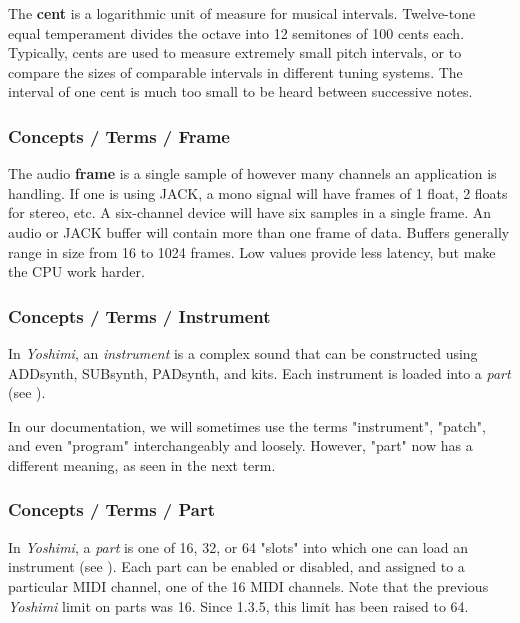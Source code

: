   The \textbf{cent}
   is a logarithmic unit of measure for musical intervals.
   Twelve-tone equal temperament divides the octave into 12
   semitones of 100 cents each. Typically, cents are used to measure
   extremely small pitch intervals, or to compare the sizes of comparable
   intervals in different tuning systems.
   The interval of one cent is much too small to be heard between
   successive notes.

\subsubsection{Concepts / Terms / Frame}
\label{subsubsec:concepts_terms_frame}

   The audio \textbf{frame}
   is a single sample of however many channels an application is handling.
   If one is using JACK, a mono signal will have frames of 1 float, 2 floats
   for stereo, etc.  A six-channel device will have six samples in a single
   frame.  An audio or JACK buffer will contain more than one frame of data.
   Buffers generally range in size from 16 to 1024 frames.  Low values provide
   less latency, but make the CPU work harder.

\subsubsection{Concepts / Terms / Instrument}
\label{subsubsec:concepts_terms_instrument}

   In \textsl{Yoshimi}, an \textsl{instrument} is a complex sound that can
   be constructed using ADDsynth, SUBsynth, PADsynth, and kits.
   Each instrument is loaded into a \textsl{part}
   (see ).

   In our documentation, we will sometimes use the terms "instrument",
   "patch", and even "program" interchangeably and loosely.
   However, "part" now has a different meaning, as seen in the next term.

\subsubsection{Concepts / Terms / Part}
\label{subsubsec:concepts_terms_part}

   In \textsl{Yoshimi}, a \textsl{part} is one of 16, 32, or
   64 "slots" into which one can load an instrument (see
   ).  Each part can be
   enabled or disabled, and assigned to a particular MIDI channel, one of
   the 16 MIDI channels.
   Note that the previous \textsl{Yoshimi} limit on parts was 16.
   Since 1.3.5, this limit has been raised to 64.

